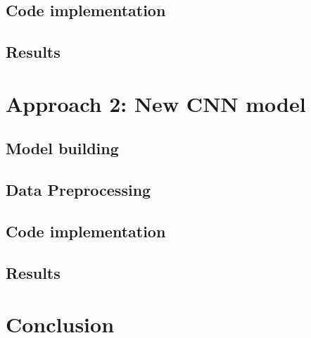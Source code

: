 \documentclass{article}
\begin{document}
    	\newpage
    	\subsection{Code implementation}
    	
    
    	\newpage
    	\subsection{Results}
    	
    	
    \newpage
    \section{Approach 2: New CNN model}
        	    	
    	\subsection{Model building}
    	
    
    	\newpage
    	\subsection{Data Preprocessing}
    	
    	
    	\newpage
    	\subsection{Code implementation}
    	
    
    	\newpage
    	\subsection{Results}
    	

	\newpage
    \section{Conclusion}
    
    
    
    
\end{document}
